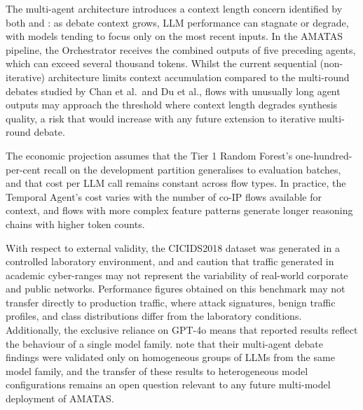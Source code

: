 \documentclass[../main.tex]{subfiles}
\begin{document}
The multi-agent architecture introduces a context length concern identified by both \textcite{Chan2023} and \textcite{Du2023}: as debate context grows, LLM performance can stagnate or degrade, with models tending to focus only on the most recent inputs. In the AMATAS pipeline, the Orchestrator receives the combined outputs of five preceding agents, which can exceed several thousand tokens. Whilst the current sequential (non-iterative) architecture limits context accumulation compared to the multi-round debates studied by Chan et al.\ and Du et al., flows with unusually long agent outputs may approach the threshold where context length degrades synthesis quality, a risk that would increase with any future extension to iterative multi-round debate.

The economic projection assumes that the Tier 1 Random Forest's one-hundred-per-cent recall on the development partition generalises to evaluation batches, and that cost per LLM call remains constant across flow types. In practice, the Temporal Agent's cost varies with the number of co-IP flows available for context, and flows with more complex feature patterns generate longer reasoning chains with higher token counts.

With respect to external validity, the CICIDS2018 dataset was generated in a controlled laboratory environment, and \textcite{Kenyon2020} and \textcite{Ring2019} caution that traffic generated in academic cyber-ranges may not represent the variability of real-world corporate and public networks. Performance figures obtained on this benchmark may not transfer directly to production traffic, where attack signatures, benign traffic profiles, and class distributions differ from the laboratory conditions. Additionally, the exclusive reliance on GPT-4o means that reported results reflect the behaviour of a single model family. \textcite{Chan2023} note that their multi-agent debate findings were validated only on homogeneous groups of LLMs from the same model family, and the transfer of these results to heterogeneous model configurations remains an open question relevant to any future multi-model deployment of AMATAS.

\onlystandalone{\printbibliography}
\end{document}
